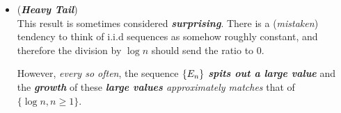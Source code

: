 \documentclass[11pt]{article}
\begin{document}
\begin{itemize}
\begin{proof}
For the event $\set{\brac{\frac{E_{n}(\omega)}{\log n}>  1-\epsilon_{s}}, n\ge 1}$,
\begin{align*}
\sum_{n=1}^{\infty}\cP\set{\frac{E_{n}(\omega)}{\log n}>  1-\epsilon_{s}} &= \sum_{n=1}^{\infty}\exp\paren{(1-\epsilon_{s})\log n } = \sum_{n=1}^{\infty}\frac{1}{n^{(-1+\epsilon_{s})}}=\infty,
\end{align*}
so $\set{\brac{\frac{E_{n}(\omega)}{\log n}>  1-\epsilon_{s}}, i.o.}$ occurs with probability $1$ for all $s$.

\begin{align*}
\cP\set{\liminf\limits_{n\rightarrow \infty}\brac{\frac{E_{n}(\omega)}{\log n}\le  1+\epsilon_{s}}} 
&= 1- \cP\set{\limsup\limits_{n\rightarrow \infty}\brac{\frac{E_{n}(\omega)}{\log n}\ge  -1-\epsilon_{s}}} 
\end{align*}
Since 
\begin{align*}
\sum_{n=1}^{\infty}\cP\set{\frac{E_{n}(\omega)}{\log n}\ge  -1-\epsilon_{s}} &= \sum_{n=1}^{\infty}\exp\paren{(-1-\epsilon_{s})\log n }\\
&= \sum_{n=1}^{\infty}\frac{1}{n^{(1+\epsilon_{s})}} < \infty,
\end{align*}
we have 
\begin{align*}
\cP\set{\liminf\limits_{n\rightarrow \infty}\brac{\frac{E_{n}(\omega)}{\log n}\le  1+\epsilon_{s}}} 
&= 1- \cP\set{\limsup\limits_{n\rightarrow \infty}\brac{\frac{E_{n}(\omega)}{\log n}\ge  -1-\epsilon_{s}}} \\
&= 1- 0= 1. \qed
\end{align*}
\end{proof}

\item 
\begin{remark} (\emph{\textbf{Heavy Tail}})\\
This result is sometimes considered \emph{\textbf{surprising}}. There is a (\emph{mistaken}) tendency to think of i.i.d sequences as somehow roughly constant, and therefore the division by $\log n$ should send the ratio to $0$. 

However, \emph{every so often}, the sequence $\left\{E_n\right\}$ \emph{\textbf{spits out a large value}} and the \emph{\textbf{growth}} of these \emph{\textbf{large values} approximately matches} that of $\{\log n, n \ge 1\}$.
\end{remark}



\end{itemize}
\end{document}
